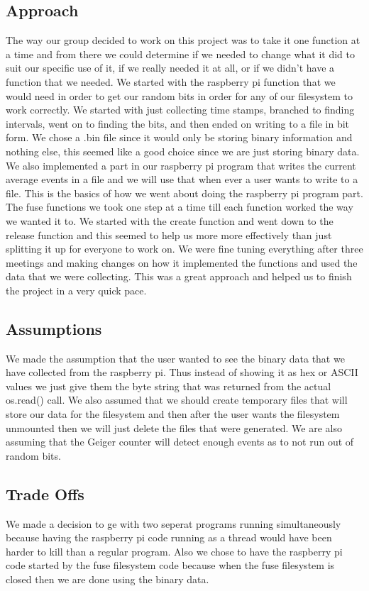 \documentclass{paper}
\begin{document}
\begin{doublespace}
\section{Approach}
The way our group decided to work on this project was to take it one function at a time and from there we could determine if we needed to change what it did to suit our specific use of it, if we really needed it at all, or if we didn't have a function that we needed. We started with the raspberry pi function that we would need in order to get our random bits in order for any of our filesystem to work correctly. We started with just collecting time stamps, branched to finding intervals, went on to finding the bits, and then ended on writing to a file in bit form. We chose a .bin file since it would only be storing binary information and nothing else, this seemed like a good choice since we are just storing binary data. 
We also implemented a part in our raspberry pi program that writes the current average events in a file and we will use that when ever a user wants to write to a file. This is the basics of how we went about doing the raspberry pi program part. The fuse functions we took one step at a time till each function worked the way we wanted it to. We started with the create function and went down to the release function and this seemed to help us more more effectively than just splitting it up for everyone to work on. We were fine tuning everything after three meetings and making changes on how it implemented the functions and used the data that we were collecting. This was a great approach and helped us to finish the project in a very quick pace. 
\subsection{Assumptions}
We made the assumption that the user wanted to see the binary data that we have collected from the raspberry pi. Thus instead of showing it as hex or ASCII values we just give them the byte string that was returned from the actual os.read() call. We also assumed that we should create temporary files that will store our data for the filesystem and then after the user wants the filesystem unmounted then we will just delete the files that were generated. We are also assuming that the Geiger counter will detect enough events as to not run out of random bits.

\subsection{Trade Offs}
We made a decision to ge with two seperat programs running simultaneously because having the raspberry pi code running as a thread would have been harder to kill than a regular program. Also we chose to have the raspberry pi code started by the fuse filesystem code because when the fuse filesystem is closed then we are done using the binary data. 

\end{doublespace}
\end{document}
